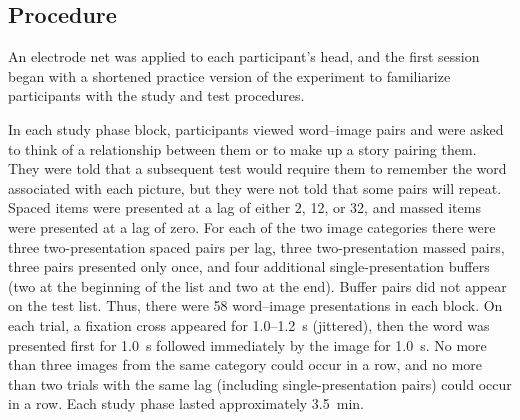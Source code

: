 
\subsection{Procedure}

An electrode net was applied to each participant's head, and the first session began with a shortened practice version of the experiment to familiarize participants with the study and test procedures.




In each study phase block, participants viewed word--image pairs and were asked to think of a relationship between them or to make up a story pairing them.  They were told that a subsequent test would require them to remember the word associated with each picture, but they were not told that some pairs will repeat.  Spaced items were presented at a lag of either 2, 12, or 32, and massed items were presented at a lag of zero.  For each of the two image categories there were three two-presentation spaced pairs per lag, three two-presentation massed pairs, three pairs presented only once, and four additional single-presentation buffers (two at the beginning of the list and two at the end).  Buffer pairs did not appear on the test list.
Thus, there were 58 word--image presentations in each block.  On each trial, a fixation cross appeared for 1.0--1.2~s (jittered), then the word was presented first for 1.0~s followed immediately by the image for 1.0~s.  No more than three images from the same category could occur in a row, and no more than two trials with the same lag (including single-presentation pairs) could occur in a row.  Each study phase lasted approximately 3.5~min.

